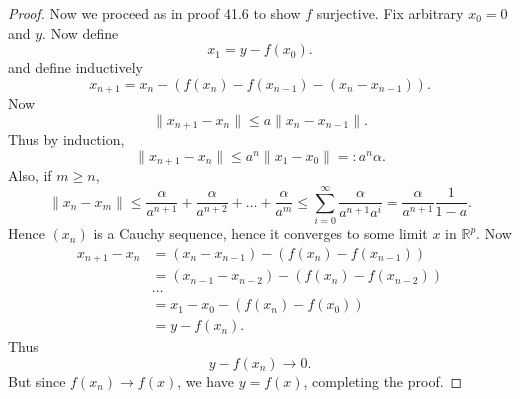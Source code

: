 \begin{itemize}
\begin{proof}
	Now we proceed as in proof 41.6 to show $f$ surjective. Fix arbitrary $x_0 =0$ and $y$. Now define
	\[
		x_1 = y - f(x_0)
	.\] 
	and define inductively
	\[
		x_{n+1} = x_n - (f(x_n) - f(x_{n-1}) - (x_n - x_{n-1}))
	.\] 
	Now
	\[
		\|x_{n+1} - x_n\| \le  a \|x_{n} - x_{n-1}\|
	.\] 
	Thus by induction,
	\[
		\|x_{n+1}- x_{n}\| \le a^n \|x_1- x_0\| =: a^n \alpha
	.\] 
	Also, if $m \ge n$,
	\[
		\|x_{n} - x_m\| \le \frac{\alpha}{a^{n+1}} + \frac{\alpha}{a^{n+2}} + \ldots + \frac{\alpha}{a^m} \le \sum_{i=0}^{\infty} \frac{\alpha}{a^{n+1} a^i} = \frac{\alpha}{a^{n+1}} \frac{1}{1-a}
	.\] 
	Hence $(x_n)$ is a Cauchy sequence, hence it converges to some limit  $x$ in $\mathbb{R}^p$. Now
	\begin{align*}
		x_{n+1} - x_n &= (x_n - x_{n-1}) - \left(f(x_n) - f(x_{n-1 })\right) \\
		&= (x_{n-1} - x_{n-2}) - \left( f(x_n) - f(x_{n-2 }) \right)  \\
		&\ldots\\
		&= x_1 - x_0 - \left( f(x_n) - f(x_0) \right)  \\
		&= y - f(x_n)
	.\end{align*}
	Thus
	\[
		y - f(x_n) \to 0
	.\] 
	But since $f(x_n) \to  f(x)$, we have $y = f(x)$, completing the proof.
\end{proof}
\end{itemize}
